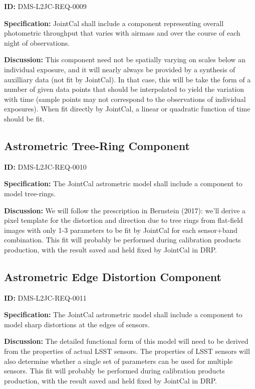 \documentclass[SE,toc,lsstdraft]{lsstdoc}
\begin{document}
\label{DMS-L2JC-REQ-0009}
\textbf{ID:} DMS-L2JC-REQ-0009

\textbf{Specification:}
JointCal shall include a component representing overall photometric throughput that varies with airmass and over the course of each night of observations.

\textbf{Discussion:}
This component need not be spatially varying on scales below an individual exposure, and it will nearly always be provided by a synthesis of auxilliary data (not fit by JointCal).  In that case, this will be take the form of a number of given data points that should be interpolated to yield the variation with time (sample points may not correspond to the observations of individual exposures).  When fit directly by JointCal, a linear or quadratic function of time should be fit.

\subsection{Astrometric Tree-Ring Component}

\label{DMS-L2JC-REQ-0010}
\textbf{ID:} DMS-L2JC-REQ-0010

\textbf{Specification:}
The JointCal astrometric model shall include a component to model tree-rings.

\textbf{Discussion:}
We will follow the prescription in Bernstein (2017): we'll derive a pixel template for the distortion and direction due to tree rings from flat-field images with only 1-3 parameters to be fit by JointCal for each sensor+band combination.  This fit will probably be performed during calibration products production, with the result saved and held fixed by JointCal in DRP.

\subsection{Astrometric Edge Distortion Component}

\label{DMS-L2JC-REQ-0011}
\textbf{ID:} DMS-L2JC-REQ-0011

\textbf{Specification:}
The JointCal astrometric model shall include a component to model sharp distortions at the edges of sensors.

\textbf{Discussion:}
The detailed functional form of this model will need to be derived from the properties of actual LSST sensors.  The properties of LSST sensors will also determine whether a single set of parameters can be used for multiple sensors.  This fit will probably be performed during calibration products production, with the result saved and held fixed by JointCal in DRP.
\end{document}
